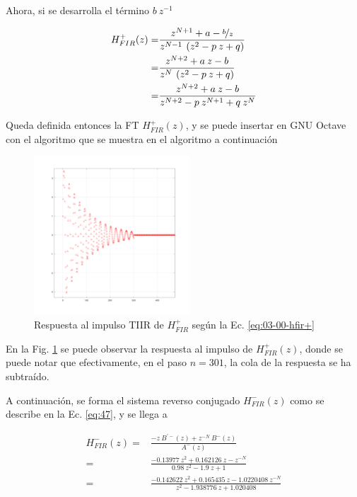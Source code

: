     Ahora, si se desarrolla el término $b \: z^{-1}$

    \begin{align}
      H_{FIR}^{+}(z) =& \frac{z^{N+1} + a - \nicefrac{b}{z}}{z^{N-1} \: \left( z^{2} - p \: z + q \right)} \nonumber \\
      =& \frac{z^{N+2} + a \: z - b}{z^{N} \: \left( z^{2} - p \: z + q \right)} \nonumber \\
      =& \frac{z^{N+2} + a \: z - b}{z^{N+2} - p \: z^{N+1} + q \: z^{N}}
      \label{eq:03-00-hfir+}
    \end{align}

    Queda definida entonces la FT $H_{FIR}^{+}(z)$, y se puede insertar en GNU Octave con el algoritmo que se muestra en el algoritmo a continuación

    

    \begin{figure}
      \centering
      \includegraphics[width=0.52\textwidth]{../images/03-00-hfir+.png}
      \caption{Respuesta al impulso TIIR de $H_{FIR}^{+}$ según la Ec. \ref{eq:03-00-hfir+}}
      \label{fig:03-00-hfir+}
    \end{figure}

    En la Fig. \ref{fig:03-00-hfir+} se puede observar la respuesta al impulso de $H_{FIR}^{+}(z)$, donde se puede notar que efectivamente, en el paso $n=301$, la cola de la respuesta se ha subtraído.

    A continuación, se forma el sistema reverso conjugado $H_{FIR}^{-}(z)$ como se describe en la Ec. \ref{eq:47}, y se llega a

    \begin{align}
      H_{FIR}^{-}(z) =& \frac{-z \: B^{\prime -}(z) + z^{-N} \: B^{-}(z)}{A^{-}(z)} \nonumber \\
      =& \frac{-0.13977 \: z^{2} + 0.162126 \: z - z^{-N}}{0.98 \: z^{2} - 1.9 \: z +1} \nonumber \\
      =& \frac{-0.142622 \: z^{2} + 0.165435 \: z - 1.0220408 \: z^{-N}}{z^{2} - 1.938776 \: z + 1.020408}
    \end{align}

